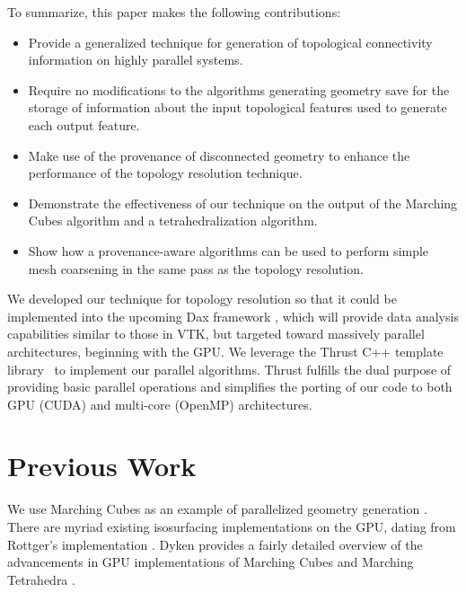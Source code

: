 \documentclass[10pt,journal,cspaper,compsoc]{IEEEtran}
\begin{document}
\noindent
\begin{minipage}{\linewidth}
To summarize, this paper makes the following contributions:
\begin{itemize}
	\item{Provide a generalized technique for generation of topological connectivity information on highly parallel systems.}
	\item{Require no modifications to the algorithms generating geometry save for the
		storage of information about the input topological features used to generate each output feature.}

	\item{Make use of the provenance of disconnected geometry to enhance the performance of the topology
		resolution technique.}

	\item{Demonstrate the effectiveness of our technique on the output of the Marching Cubes
		algorithm and a tetrahedralization algorithm.}
 
	\item{Show how a provenance-aware algorithms can be used to perform
		 simple mesh coarsening in the same pass as the topology resolution.}
 
\end{itemize}
\vspace{5mm}
\end{minipage}

We developed our technique for topology resolution so that it could be implemented
into the upcoming Dax framework \cite{Moreland_Ayachit_Geveci_Ma_2011}, which will provide data analysis capabilities similar to those
in VTK, but targeted toward massively parallel architectures, beginning with the GPU.
We leverage the Thrust C++ template library~\cite{Bell2012} to implement
our parallel algorithms.  Thrust fulfills the dual purpose of providing
basic parallel operations and simplifies the porting of our code to both
GPU (CUDA) and multi-core (OpenMP) architectures.

\section{Previous Work}
\label{sec:PreviousWork}

We use Marching Cubes as an example of parallelized geometry 
generation \cite{Lorensen1987}. There are myriad existing isosurfacing implementations on the GPU, dating from 
Rottger's implementation \cite{Rottger2000}. Dyken provides a fairly 
detailed overview of the advancements in GPU implementations of Marching Cubes and 
Marching Tetrahedra \cite{Dyken2008}.
\end{document}
